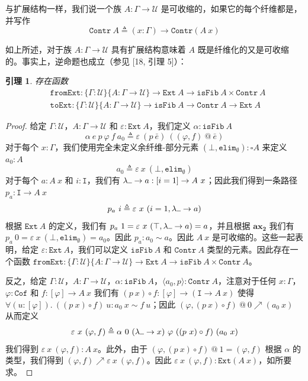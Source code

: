\documentclass{ctexrep}
\theoremstyle{plain}
\newtheorem{lemma}[theorem]{引理}
\theoremstyle{definition}
\theoremstyle{remark}
\newcommand\ttI{\mathtt{I}}
\newcommand{\ax}[1]{\mathbf{ax_{#1}}}
\newcommand{\ul}{{\rule[0ex]{0.5em}{0.4pt}}} %
\begin{document}
与扩展结构一样，我们说一个族 $A : \Gamma \to \mathcal{U}$ 是可收缩的，如果它的每个纤维都是，并写作
\[
\mathtt{Contr}\ A \triangleq (x : \Gamma) \to \mathtt{Contr}(A\ x)
\]

如上所述，对于族 $A : \Gamma \to \mathcal{U}$ 具有扩展结构意味着 $A$ 既是纤维化的又是可收缩的。事实上，逆命题也成立（参见 [18, 引理 5]）：

\begin{lemma}
存在函数
\begin{align}
&\mathtt{fromExt} : \{\Gamma : \mathcal{U}\}\{A : \Gamma \to \mathcal{U}\} \to \mathtt{Ext}\ A \to \mathtt{isFib}\ A \times \mathtt{Contr}\ A \\
&\mathtt{toExt} : \{\Gamma : \mathcal{U}\}\{A : \Gamma \to \mathcal{U}\} \to \mathtt{isFib}\ A \to \mathtt{Contr}\ A \to \mathtt{Ext}\ A
\end{align}
\end{lemma}

\begin{proof}
给定 $\Gamma : \mathcal{U}$，$A : \Gamma \to \mathcal{U}$ 和 $\varepsilon : \mathtt{Ext}\ A$，我们定义 $\alpha : \mathtt{isFib}\ A$
\[
\alpha\ e\ p\ \varphi\ f\ a_0 \triangleq \varepsilon\ (p\ \bar{e})\ ((\varphi, f)\ @\ \bar{e})
\]
对于每个 $x : \Gamma$，我们使用完全未定义余纤维-部分元素 $(\bot, \mathtt{elim}_{\emptyset}) : \square A$ 来定义 $a_0 : A$
\[
a_0 \triangleq \varepsilon\ x\ (\bot, \mathtt{elim}_{\emptyset})
\]
对于每个 $a : A\ x$ 和 $i : \ttI$，我们有 $\lambda\ul  \to a : [i = 1] \to A\ x$；因此我们得到一条路径 $p_a : \ttI \to A\ x$
\[
p_a\ i \triangleq \varepsilon\ x\ (i = 1, \lambda\ul  \to a)
\]
根据 $\mathtt{Ext}\ A$ 的定义，我们有 $p_a\ 1 = \varepsilon\ x\ (\top, \lambda\ul  \to a) = a$，并且根据 $\ax{2}$ 我们有 $p_a\ 0 = \varepsilon\ x\ (\bot, \mathtt{elim}_{\emptyset}) = a_0$。因此 $p_a : a_0 \sim a$。因此 $A\ x$ 是可收缩的。这些一起表明，给定 $\varepsilon : \mathtt{Ext}\ A$，我们可以定义 $\mathtt{isFib}\ A$ 和 $\mathtt{Contr}\ A$ 类型的元素。因此存在一个函数 $\mathtt{fromExt} : \{\Gamma : \mathcal{U}\}\{A : \Gamma \to \mathcal{U}\} \to \mathtt{Ext}\ A \to \mathtt{isFib}\ A \times \mathtt{Contr}\ A$。

反之，给定 $\Gamma : \mathcal{U}$，$A : \Gamma \to \mathcal{U}$，$\alpha : \mathtt{isFib}\ A$，$\langle a_0, p\rangle : \mathtt{Contr}\ A$，注意对于任何 $x : \Gamma$，$\varphi : \mathtt{Cof}$ 和 $f : [\varphi] \to A\ x$ 我们有 $(p\ x) \circ f : [\varphi] \to (\ttI \to A\ x)$ 使得 $\forall(u : [\varphi]).\ ((p\ x) \circ f)\ u : a_0\ x \sim f\ u$；因此 $(\varphi, (p\ x) \circ f)\ @\ 0 \nearrow (a_0\ x)$ 从而定义
\[
\varepsilon\ x\ (\varphi, f) \triangleq \alpha\ 0\ (\lambda\ul  \to x)\ \varphi\ ((p\ x) \circ f)\ (a_0\ x)
\]
我们得到 $\varepsilon\ x\ (\varphi, f) : A\ x$。此外，由于 $(\varphi, (p\ x) \circ f)\ @\ 1 = (\varphi, f)$ 根据 $\alpha$ 的类型，我们得到 $(\varphi, f) \nearrow \varepsilon\ x\ (\varphi, f)$。因此 $\varepsilon\ x\ (\varphi, f) : \mathtt{Ext}(A\ x)$，如所要求。
\end{proof}
\end{document}
